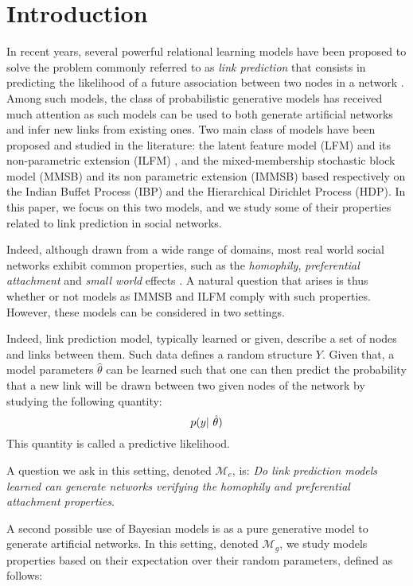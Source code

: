 \section{Introduction}
\label{sec:introduction}
In recent years, several powerful relational learning models have been proposed to solve the problem commonly referred to as \textit{link prediction} that consists in predicting the likelihood of a future association between two nodes in a network \cite{Liben-Nowell07, HassanZaki11}. Among such models, the class of probabilistic generative models has received much attention as such models can be used to both generate artificial networks and infer new links from existing ones. Two main class of models have been proposed and studied in the literature: the latent feature model (LFM) \cite{BMF} and its non-parametric extension (ILFM) \cite{ILFRM}, and the mixed-membership stochastic block model (MMSB) \cite{MMSB} and its non parametric extension (IMMSB) \cite{iMMSB,diMMSB} based respectively on the Indian Buffet Process (IBP) and the Hierarchical Dirichlet Process (HDP). In this paper, we focus on this two models, and we study some of their properties related to link prediction in social networks. 

Indeed, although drawn from a wide range of domains, most real world social networks exhibit common properties, such as the \textit{homophily}, \textit{preferential attachment} and \textit{small world} effects \cite{Newman2010, Barabasi2003}. A natural question that arises is thus whether or not models as IMMSB and ILFM comply with such properties. However, these models can be considered in two settings. 


Indeed, link prediction model, typically learned or given, describe a set of nodes and links between them. Such data defines a random structure $Y$. Given that, a model parameters $\hat \theta$ can be learned such that one can then predict the probability that a new link will be drawn between two given nodes of the network by studying the following quantity:
\begin{equation}
\p(y | \hat \theta)
\end{equation}
This quantity is called a predictive likelihood.


A question we ask in this setting, denoted $\mathcal{M}_e$, is: \textit{Do link prediction models learned can generate networks verifying the homophily and preferential attachment properties}.

A second possible use of Bayesian models is as a pure generative model to generate artificial networks. In this setting, denoted $\mathcal{M}_g$, we study models properties based on their expectation over their random parameters, defined as follows:

